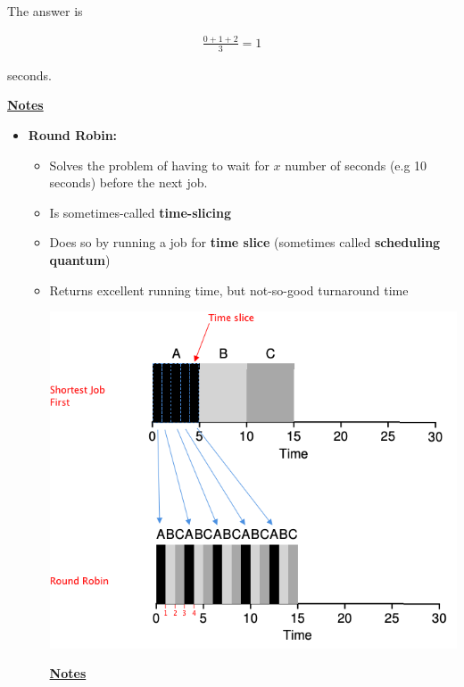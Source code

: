 \documentclass[12pt]{article}
\begin{document}
\begin{enumerate}[1.]
    \bigskip

    The answer is


    \begin{align}
        \frac{0 + 1 + 2}{3} = 1
    \end{align}

    seconds.

    \bigskip

    \underline{\textbf{Notes}}

    \begin{itemize}
        \item \textbf{Round Robin:}

        \begin{itemize}
            \item Solves the problem of having to wait for $x$ number of seconds (e.g 10 seconds)
            before the next job.
            \item Is sometimes-called \textbf{time-slicing}
            \item Does so by running a job for \textbf{time slice} (sometimes called \textbf{scheduling quantum})
            \item Returns excellent running time, but not-so-good turnaround time


            \begin{center}
            \includegraphics[width=0.8\linewidth]{images/worksheet_4_solution_4.png}
            \end{center}

            \bigskip

            \underline{\textbf{Notes}}

            \bigskip


\end{itemize}
\end{itemize}
\end{enumerate}
\end{document}
